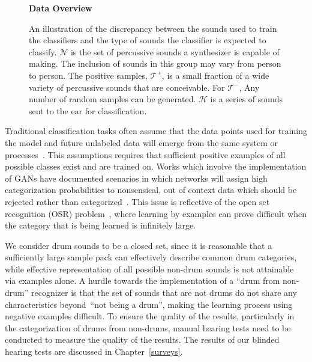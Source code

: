 \documentclass[\main/thesis.tex]{subfiles}
\begin{document}
\begin{figure}[]
    \begin{center}
    \textbf{Data Overview}
    \end{center}
    \caption{ An illustration of the discrepancy between the sounds used to train the classifiers and the type of sounds the classifier is expected to classify. $\mathcal{N}$ is the set of percussive sounds a synthesizer is capable of making. The inclusion of sounds in this group may vary from person to person. The positive samples, $\mathcal{T^{+}}$, is a small fraction of a wide variety of percussive sounds that are conceivable. For $\mathcal{T^{-}}$, Any number of random samples can be generated. $\mathcal{H}$ is a series of sounds sent to the ear for classification.}
\label{fig:ven_data}
\end{figure}

Traditional classification tasks often assume that the data points used for training the model and future unlabeled data will emerge from the same system or processes~\cite{geng2020recent,mundt2019open}. This assumptions requires that sufficient positive examples of all possible classes exist and are trained on. Works which involve the implementation of GANs have documented scenarios in which networks will assign high categorization probabilities to nonsensical, out of context data which should be rejected rather than categorized~\cite{geng2020recent,mundt2019open,hassen2020learning}. This issue is reflective of the open set recognition (OSR) problem~\cite{geng2020recent,mundt2019open}, where learning by examples can prove difficult when the category that is being learned is infinitely large. 

We consider drum sounds to be a closed set, since it is reasonable that a sufficiently large sample pack can effectively describe common drum categories, while effective representation of all possible non-drum sounds is not attainable via examples alone. A hurdle towards the implementation of a \enquote{drum from non-drum} recognizer is that the set of sounds that are not drums do not share any characteristics beyond~\enquote{not being a drum}, making the learning process using negative examples difficult.  To ensure the quality of the results, particularly in the categorization of drums from non-drums, manual hearing tests need to be conducted to measure the quality of the results. The results of our blinded hearing tests are discussed in Chapter~\ref{surveys}.
\end{document}
